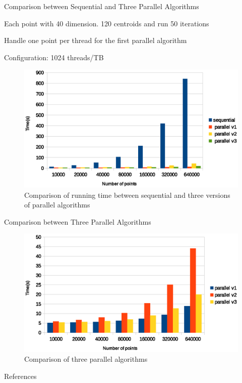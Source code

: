 \documentclass[
nopagebreaks,
style=klope,
fleqn]{powerdot}
\begin{document}
\begin{slide}{Comparison between Sequential and Three Parallel Algorithms}
  \begin{compactitem}
  \item{Each point with 40 dimension. 120 centroids and run 50 iterations}
  \item{Handle one point per thread for the first parallel algorithm}
  \item{Configuration: 1024 threads/TB}
  \end{compactitem}
  \begin{figure}[!h]
    \centering
    \includegraphics[width=0.7\linewidth]{fig/all_comparison}
    \caption{Comparison of running time between sequential and three versions of parallel algorithms}
    \label{fig:all}
  \end{figure}
\end{slide}

\begin{slide}{Comparison between Three Parallel Algorithms}
  \begin{figure}[!h]
    \centering  
    \includegraphics[width=0.9\linewidth]{fig/parallel_algorithm_comparison}
    \caption{Comparison of three parallel algorithms}
    \label{fig:par}
  \end{figure}
\end{slide}

\begin{slide} {References}
\footnotesize


\end{slide}
\end{document}
